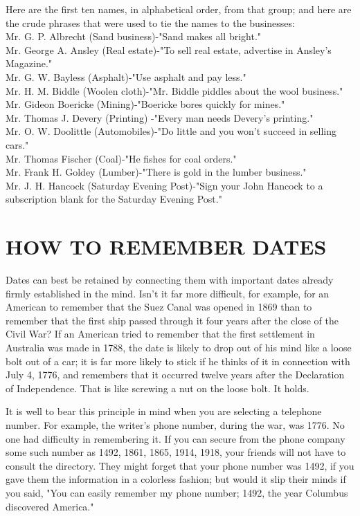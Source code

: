 \documentclass[10pt]{article}
\begin{document}
Here are the first ten names, in alphabetical order, from that group; and here are the crude phrases that were used to tie the names to the businesses:\\
Mr. G. P. Albrecht (Sand business)-"Sand makes all bright."\\
Mr. George A. Ansley (Real estate)-"To sell real estate, advertise in Ansley's Magazine."\\
Mr. G. W. Bayless (Asphalt)-"Use asphalt and pay less."\\
Mr. H. M. Biddle (Woolen cloth)-"Mr. Biddle piddles about the wool business."\\
Mr. Gideon Boericke (Mining)-"Boericke bores quickly for mines."\\
Mr. Thomas J. Devery (Printing) -"Every man needs Devery's printing."\\
Mr. O. W. Doolittle (Automobiles)-"Do little and you won't succeed in selling cars."\\
Mr. Thomas Fischer (Coal)-"He fishes for coal orders."\\
Mr. Frank H. Goldey (Lumber)-"There is gold in the lumber business."\\
Mr. J. H. Hancock (Saturday Evening Post)-"Sign your John Hancock to a subscription blank for the Saturday Evening Post."

\section*{HOW TO REMEMBER DATES}
Dates can best be retained by connecting them with important dates already firmly established in the mind. Isn't it far more difficult, for example, for an American to remember that the Suez Canal was opened in 1869 than to remember that the first ship passed through it four years after the close of the Civil War? If an American tried to remember that the first settlement in Australia was made in 1788, the date is likely to drop out of his mind like a loose bolt out of a car; it is far more likely to stick if he thinks of it in connection with July 4, 1776, and remembers that it occurred twelve years after the Declaration of Independence. That is like screwing a nut on the loose bolt. It holds.

It is well to bear this principle in mind when you are selecting a telephone number. For example, the writer's phone number, during the war, was 1776. No one had difficulty in remembering it. If you can secure from the phone company some such number as 1492, 1861, 1865, 1914, 1918, your friends will not have to consult the directory. They might forget that your phone number was 1492, if you gave them the information in a colorless fashion; but would it slip their minds if you said, "You can easily remember my phone number; 1492, the year Columbus discovered America."
\end{document}
